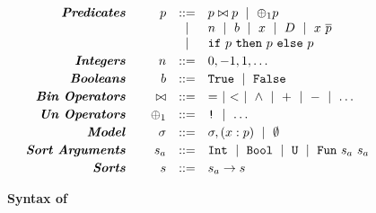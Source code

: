 \begin{figure}[t!]
\centering
$$
\begin{array}{rrcl}
\emphbf{Predicates} \quad
  & \pred & ::= &
    \pred \binop \pred \spmid
    \unop \pred \\
  && \spmid & n \spmid b \spmid x \spmid \dc \spmid  x\ \overline{\pred}\\
  && \spmid & \eif{\pred}{\pred}{\pred}
\\[0.03in]

\emphbf{Integers} \quad
  & n
  & ::= & 0, -1, 1, \dots
\\[0.03in]

\emphbf{Booleans} \quad
  & b
  & ::= & \etrue \spmid \efalse
\\[0.03in]

\emphbf{Bin Operators} \quad
  & \binop
  & ::= & = \spmid < \spmid \land \spmid + \spmid - \spmid \dots
\\[0.03in]

\emphbf{Un Operators} \quad
  & \unop
  & ::= & \lnot \spmid \dots 
\\[0.03in]

\emphbf{Model} \quad
  & \sigma
  & ::= & \sigma, (x:\pred) \spmid \emptyset
\\[0.03in]

\emphbf{Sort Arguments} \quad
  & \sort_a
  & ::= & \tint \spmid \tbool \spmid \tuniv 
         \spmid \tsmtfun{\sort_a}{\sort_a}
\\[0.03in]
\emphbf{Sorts} \quad
  & \sort
  & ::=  & \sort_a \rightarrow \sort
\end{array}
$$
\caption{\textbf{Syntax of \smtlan}}
\label{fig:appendix:smtsyntax}
\end{figure}
